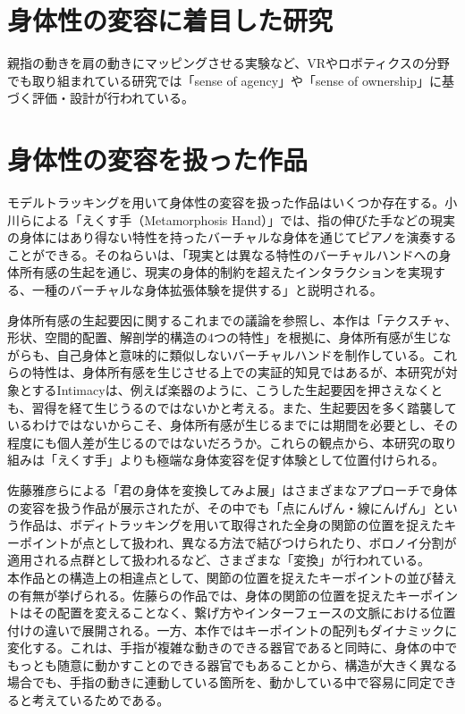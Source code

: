 \section{身体性の変容に着目した研究}
親指の動きを肩の動きにマッピングさせる実験など、VRやロボティクスの分野でも取り組まれている研究では「sense of agency」や「sense of ownership」に基づく評価・設計が行われている。

\section{身体性の変容を扱った作品}
モデルトラッキングを用いて身体性の変容を扱った作品はいくつか存在する。小川らによる「えくす手（Metamorphosis Hand）」\cite{ekusute}では、指の伸びた手などの現実の身体にはあり得ない特性を持ったバーチャルな身体を通じてピアノを演奏することができる。そのねらいは、「現実とは異なる特性のバーチャルハンドへの身体所有感の生起を通じ、現実の身体的制約を超えたインタラクションを実現する、一種のバーチャルな身体拡張体験を提供する」と説明される。

身体所有感の生起要因に関するこれまでの議論を参照し、本作は「テクスチャ、形状、空間的配置、解剖学的構造の4つの特性」を根拠に、身体所有感が生じながらも、自己身体と意味的に類似しないバーチャルハンドを制作している。これらの特性は、身体所有感を生じさせる上での実証的知見ではあるが、本研究が対象とするIntimacyは、例えば楽器のように、こうした生起要因を押さえなくとも、習得を経て生じうるのではないかと考える。また、生起要因を多く踏襲しているわけではないからこそ、身体所有感が生じるまでには期間を必要とし、その程度にも個人差が生じるのではないだろうか。これらの観点から、本研究の取り組みは「えくす手」よりも極端な身体変容を促す体験として位置付けられる。

佐藤雅彦らによる「君の身体を変換してみよ展」はさまざまなアプローチで身体の変容を扱う作品が展示されたが、その中でも「点にんげん・線にんげん」という作品は、ボディトラッキングを用いて取得された全身の関節の位置を捉えたキーポイントが点として扱われ、異なる方法で結びつけられたり、ボロノイ分割が適用される点群として扱われるなど、さまざまな「変換」が行われている。\\
本作品との構造上の相違点として、関節の位置を捉えたキーポイントの並び替えの有無が挙げられる。佐藤らの作品では、身体の関節の位置を捉えたキーポイントはその配置を変えることなく、繋げ方やインターフェースの文脈における位置付けの違いで展開される。一方、本作ではキーポイントの配列もダイナミックに変化する。これは、手指が複雑な動きのできる器官であると同時に、身体の中でもっとも随意に動かすことのできる器官でもあることから、構造が大きく異なる場合でも、手指の動きに連動している箇所を、動かしている中で容易に同定できると考えているためである。


